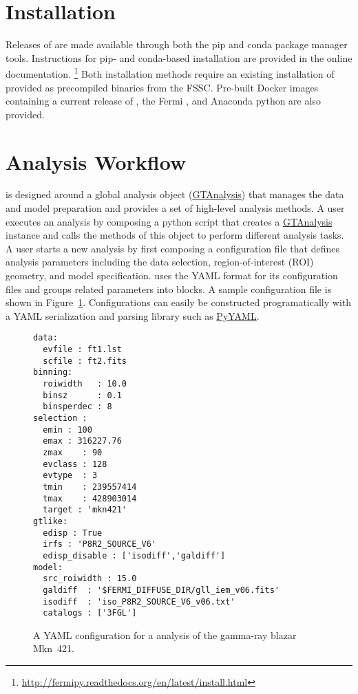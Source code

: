 \documentclass{PoS}
\newcommand{\url}[1]{\href{#1}{#1}}
\begin{document}
\section{Installation}

Releases of {\fermipy} are made available through both the pip and
conda package manager tools.  Instructions for pip- and conda-based
installation are provided in the online documentation.
\footnote{\url{http://fermipy.readthedocs.org/en/latest/install.html}}
Both installation methods require an existing installation of
{\stools} provided as precompiled binaries from the FSSC.  Pre-built
Docker images containing a current release of {\fermipy}, the Fermi
{\stools}, and Anaconda python are also provided.

\section{Analysis Workflow}\label{sec:analysis}

{\fermipy} is designed around a global analysis object
(\href{http://fermipy.readthedocs.io/en/latest/fermipy.html\#fermipy.gtanalysis.GTAnalysis}{GTAnalysis})
that manages the data and model preparation and provides a set of
high-level analysis methods.  A user executes an analysis by composing
a python script that creates a
\href{http://fermipy.readthedocs.io/en/latest/fermipy.html\#fermipy.gtanalysis.GTAnalysis}{GTAnalysis}
instance and calls the methods of this object to perform different
analysis tasks.  A user starts a new analysis by first composing a
configuration file that defines analysis parameters including the data
selection, region-of-interest (ROI) geometry, and model specification.
{\fermipy} uses the YAML format for its configuration files and groups
related parameters into blocks.  A sample configuration file is shown
in Figure~\ref{fig:fermipy_config}.  Configurations can easily be
constructed programatically with a YAML serialization and parsing
library such as \href{http://pyyaml.org/wiki/PyYAML}{PyYAML}.

\begin{figure}[t]
\begin{lstlisting}
data:
  evfile : ft1.lst
  scfile : ft2.fits
binning:
  roiwidth   : 10.0
  binsz      : 0.1
  binsperdec : 8
selection :
  emin : 100
  emax : 316227.76
  zmax    : 90
  evclass : 128
  evtype  : 3
  tmin    : 239557414
  tmax    : 428903014
  target : 'mkn421'
gtlike:
  edisp : True
  irfs : 'P8R2_SOURCE_V6'
  edisp_disable : ['isodiff','galdiff']
model:
  src_roiwidth : 15.0
  galdiff  : '$FERMI_DIFFUSE_DIR/gll_iem_v06.fits'
  isodiff  : 'iso_P8R2_SOURCE_V6_v06.txt'
  catalogs : ['3FGL']
\end{lstlisting}
\caption{A YAML configuration for a {\fermipy} analysis of the gamma-ray blazar Mkn~421.\label{fig:fermipy_config}}
\end{figure}
\end{document}
